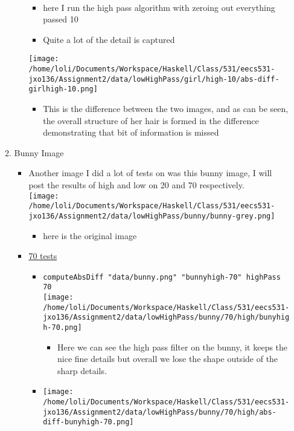 \documentclass{article}
\begin{document}
\begin{enumerate}
\begin{enumerate}
\begin{itemize}
  \\
\begin{itemize}
\item here Ι run the high pass algorithm with zeroing out everything
passed 10
\item Quite a lot of the detail is captured
\end{itemize}
\texttt{[image: /home/loli/Documents/Workspace/Haskell/Class/531/eecs531-jxo136/Assignment2/data/lowHighPass/girl/high-10/abs-diff-girlhigh-10.png]}
\begin{itemize}
\item This is the difference between the two images, and as can be seen,
the overall structure of her hair is formed in the difference
demonstrating that bit of information is missed
\end{itemize}
\end{itemize}
\item Bunny Image
\label{sec-1-3-2}
\begin{itemize}
\item Another image I did a lot of tests on was this bunny image, I will
post the results of high and low on 20 and 70 respectively. \\
  \texttt{[image: /home/loli/Documents/Workspace/Haskell/Class/531/eecs531-jxo136/Assignment2/data/lowHighPass/bunny/bunny-grey.png]}
\begin{itemize}
\item here is the original image
\end{itemize}
\item \uline{70 tests}
\begin{itemize}
\item \texttt{computeAbsDiff "data/bunny.png" "bunnyhigh-70" highPass 70} \\
    \texttt{[image: /home/loli/Documents/Workspace/Haskell/Class/531/eecs531-jxo136/Assignment2/data/lowHighPass/bunny/70/high/bunyhigh-70.png]}
\begin{itemize}
\item Here we can see the high pass filter on the bunny, it keeps the
nice fine details but overall we lose the shape outside of the
sharp details.
\end{itemize}
\item \texttt{[image: /home/loli/Documents/Workspace/Haskell/Class/531/eecs531-jxo136/Assignment2/data/lowHighPass/bunny/70/high/abs-diff-bunyhigh-70.png]}
\begin{itemize}

\end{itemize}
\end{itemize}
\end{itemize}
\end{enumerate}
\end{enumerate}
\end{document}
